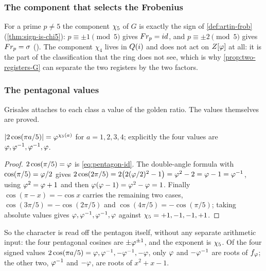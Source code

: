 \subsubsection{The component that selects the Frobenius}

For a prime $p\ne5$ the component $\chi_5$ of $G$ is exactly the sign of
\cref{def:artin-frob} (\cref{thm:sign-is-chi5}): $p\equiv\pm1\pmod5$ gives $Fr_p=id$, and
$p\equiv\pm2\pmod5$ gives $Fr_p=\sigma$
().  The
component $\chi_4$ lives in $Q(i)$ and does not act on $Z[\varphi]$ at all: it is the
part of the classification that the ring does not see, which is why
\cref{prop:two-registers-G} can separate the two registers by the two factors.

\subsubsection{The pentagonal values}

Grisales attaches to each class a value of the golden ratio.  The values
themselves are proved.

\begin{proposition}\label{thm:pentagonal-values}
$|2\cos(\pi a/5)|=\varphi^{\chi_5(a)}$ for $a=1,2,3,4$; explicitly the four values
are $\varphi,\varphi^{-1},\varphi^{-1},\varphi$.
\end{proposition}
\begin{proof}
$2\cos(\pi/5)=\varphi$ is \eqref{eq:pentagon-id}.  The double-angle formula with
$\cos(\pi/5)=\varphi/2$ gives
$2\cos(2\pi/5)=2\bigl(2(\varphi/2)^2-1\bigr)=\varphi^2-2=\varphi-1=\varphi^{-1}$,
using $\varphi^2=\varphi+1$ and then
$\varphi(\varphi-1)=\varphi^2-\varphi=1$.  Finally $\cos(\pi-x)=-\cos x$ carries
the remaining two cases, $\cos(3\pi/5)=-\cos(2\pi/5)$ and
$\cos(4\pi/5)=-\cos(\pi/5)$; taking absolute values gives
$\varphi,\varphi^{-1},\varphi^{-1},\varphi$ against $\chi_5=+1,-1,-1,+1$.
\end{proof}

So the character is read off the pentagon itself, without any separate arithmetic
input: the four pentagonal cosines are $\pm\varphi^{\pm1}$, and the exponent is
$\chi_5$.  Of the four signed values $2\cos(\pi a/5)=\varphi,\varphi^{-1},-\varphi^{-1},-\varphi$, only
$\varphi$ and $-\varphi^{-1}$ are roots of $f_\varphi$; the other two, $\varphi^{-1}$ and
$-\varphi$, are roots of $x^2+x-1$.

